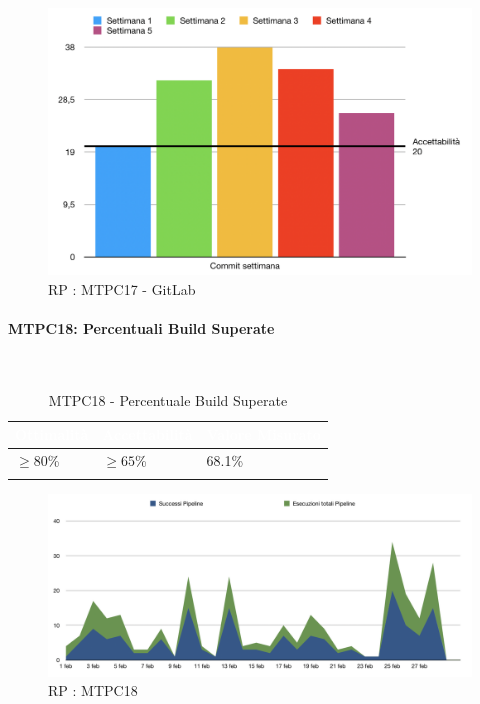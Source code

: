 \begin{figure}[H]
	\begin{center}
		\includegraphics[scale=0.5]{./images/grafici_RP/commitGitlab.png} 
	\end{center}
	\caption{RP : MTPC17 - GitLab}
\end{figure}


\paragraph{MTPC18: Percentuali Build Superate}\-\\

\begin{longtable}{|C{.15\textwidth}|C{.24\textwidth}|C{.24\textwidth}|}
\hline
{}\textbf{\textcolor{white}{Ottimalità}} & \textbf{\textcolor{white}{Accettabilità}} & \textbf{\textcolor{white}{Valore Misurato}} \\
\hline \hline
\endhead
 $\geq 80$\% & $\geq 65$\% & 68.1\% \\
\hline

\caption{MTPC18 - Percentuale Build Superate}
\label{mtpc17}
\end{longtable}
\begin{figure}[H]
	\begin{center}
		\includegraphics[scale=0.5]{./images/grafici_RP/graficoPipeline.png} 
	\end{center}
	\caption{RP : MTPC18}
\end{figure}

